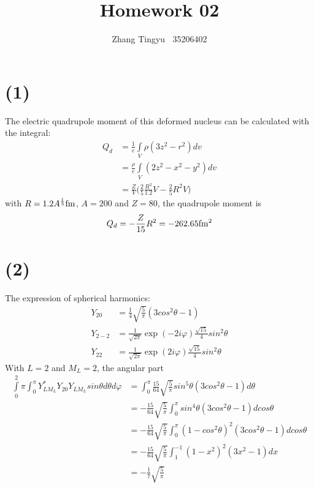\documentclass[12pt]{article}
\title{Homework 02}
\author{Zhang Tingyu $\ $ 35206402}
\begin{document}
\maketitle

\section*{(1)}

The electric quadrupole moment of this deformed nucleus can be calculated with 
the integral:
\begin{equation*}
    \begin{split}
        Q_d&=\frac{1}{e}\int\limits_V\rho(3z^2-r^2)dv\\
        &=\frac{\rho}{e}\int\limits_V(2z^2-x^2-y^2)dv\\
        &=\frac{Z}{V}\Big(\frac{2}{5}\frac{R^2}{1.2}V-\frac{2}{5}R^2V\Big)
    \end{split}
\end{equation*}
with $R=1.2A^{\frac{1}{3}}{\rm fm}$, $A=200$ and $Z=80$, the quadrupole moment is 
\begin{equation*}
    Q_d=-\frac{Z}{15}R^2=-262.65{\rm fm^2}
\end{equation*}

\section*{(2)}

The expression of spherical harmonics:
\begin{equation*}
    \begin{split}
        Y_{20}&=\frac{1}{4}\sqrt{\frac{5}{\pi}}(3cos^2\theta-1)\\
        Y_{2-2}&=\frac{1}{\sqrt{2\pi}}\exp(-2i\varphi)\frac{\sqrt{15}}{4}sin^2\theta\\
        Y_{22}&=\frac{1}{\sqrt{2\pi}}\exp(2i\varphi)\frac{\sqrt{15}}{4}sin^2\theta
    \end{split}
\end{equation*}
With $L=2$ and $M_L=2$, the angular part 
\begin{equation*}
    \begin{split}
        \int\limits_0^2\pi\int_0^\pi Y^*_{LM_L}Y_{20}Y_{LM_L}sin\theta d\theta
        d\varphi&=\int_0^\pi\frac{15}{64}\sqrt{\frac{5}{\pi}}sin^5\theta(3cos^2
        \theta-1)d\theta\\
        &=-\frac{15}{64}\sqrt{\frac{5}{\pi}}\int_0^\pi sin^4\theta(3cos^2\theta
        -1)dcos\theta\\
        &=-\frac{15}{64}\sqrt{\frac{5}{\pi}}\int_0^\pi(1-cos^2\theta)^2(3cos^2
        \theta-1)dcos\theta\\
        &=-\frac{15}{64}\sqrt{\frac{5}{\pi}}\int_1^{-1}(1-x^2)^2(3x^2-1)dx\\
        &=-\frac{1}{7}\sqrt{\frac{5}{\pi}}
    \end{split}
\end{equation*}
\end{document}
